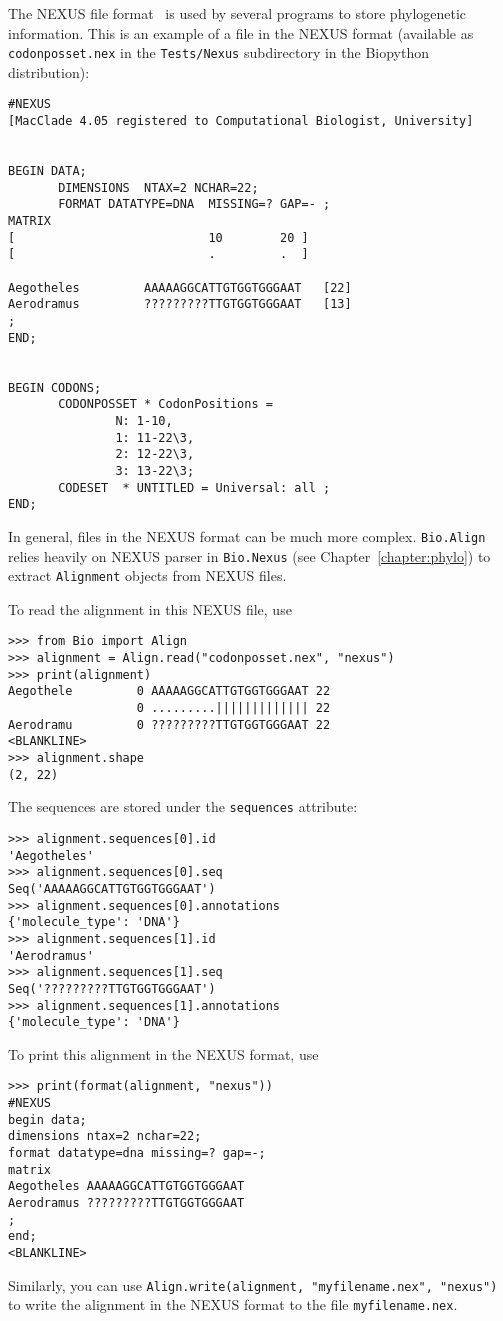 The NEXUS file format~\cite{maddison1997} is used by several programs to store phylogenetic information. This is an example of a file in the NEXUS format (available as \verb|codonposset.nex| in the \verb|Tests/Nexus| subdirectory in the Biopython distribution):
\begin{verbatim}
#NEXUS
[MacClade 4.05 registered to Computational Biologist, University]


BEGIN DATA;
       DIMENSIONS  NTAX=2 NCHAR=22;
       FORMAT DATATYPE=DNA  MISSING=? GAP=- ;
MATRIX
[                           10        20 ]
[                           .         .  ]

Aegotheles         AAAAAGGCATTGTGGTGGGAAT   [22]
Aerodramus         ?????????TTGTGGTGGGAAT   [13]
;
END;


BEGIN CODONS;
       CODONPOSSET * CodonPositions =
               N: 1-10,
               1: 11-22\3,
               2: 12-22\3,
               3: 13-22\3;
       CODESET  * UNTITLED = Universal: all ;
END;
\end{verbatim}
In general, files in the NEXUS format can be much more complex. \verb|Bio.Align| relies heavily on NEXUS parser in \verb|Bio.Nexus| (see Chapter~\ref{chapter:phylo}) to extract \verb|Alignment| objects from NEXUS files.

To read the alignment in this NEXUS file, use
\begin{verbatim}
>>> from Bio import Align
>>> alignment = Align.read("codonposset.nex", "nexus")
>>> print(alignment)
Aegothele         0 AAAAAGGCATTGTGGTGGGAAT 22
                  0 .........||||||||||||| 22
Aerodramu         0 ?????????TTGTGGTGGGAAT 22
<BLANKLINE>
>>> alignment.shape
(2, 22)
\end{verbatim}
The sequences are stored under the \verb|sequences| attribute:
\begin{verbatim}
>>> alignment.sequences[0].id
'Aegotheles'
>>> alignment.sequences[0].seq
Seq('AAAAAGGCATTGTGGTGGGAAT')
>>> alignment.sequences[0].annotations
{'molecule_type': 'DNA'}
>>> alignment.sequences[1].id
'Aerodramus'
>>> alignment.sequences[1].seq
Seq('?????????TTGTGGTGGGAAT')
>>> alignment.sequences[1].annotations
{'molecule_type': 'DNA'}
\end{verbatim}
To print this alignment in the NEXUS format, use
\begin{verbatim}
>>> print(format(alignment, "nexus"))
#NEXUS
begin data;
dimensions ntax=2 nchar=22;
format datatype=dna missing=? gap=-;
matrix
Aegotheles AAAAAGGCATTGTGGTGGGAAT
Aerodramus ?????????TTGTGGTGGGAAT
;
end;
<BLANKLINE>
\end{verbatim}
Similarly, you can use \verb|Align.write(alignment, "myfilename.nex", "nexus")| to write the alignment in the NEXUS format to the file \verb|myfilename.nex|.

